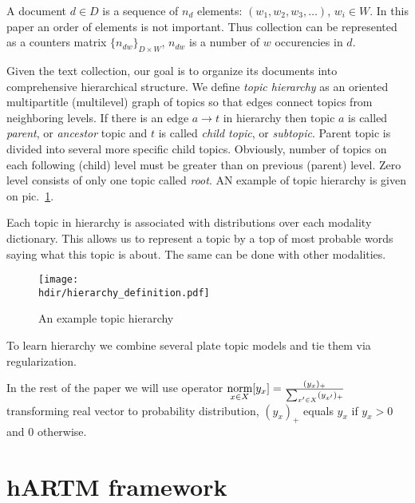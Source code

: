 \documentclass[12pt, twoside]{article}
\newcommand{\hdir}{.}
\begin{document}
A document $d \in D$ is a sequence of $n_d$ elements: $(w_1, w_2, w_3, \dots)$, $w_i \in W$. In this paper an order of elements is not important. Thus collection can be represented as a counters matrix $\{n_{dw}\}_{D \times W}$, $n_{dw}$ is a number of $w$ occurencies in $d$.

Given the text collection, our goal is to organize its documents into comprehensive hierarchical structure. We define \emph{topic hierarchy} as an oriented multipartitle (multilevel) graph of topics so that edges connect topics from neighboring levels. If there is an edge $a \rightarrow t$ in hierarchy then topic $a$ is called \emph{parent}, or \emph{ancestor} topic and $t$ is called \emph{child topic}, or \emph{subtopic}. Parent topic is divided into several more specific child topics. 
Obviously, number of topics on each following (child) level must be greater than on previous (parent) level. Zero level consists of only one topic called \emph{root}. AN example of topic hierarchy is given on pic.~\ref{fg:hierarchy}.

Each topic in hierarchy is associated with distributions over each modality dictionary. This allows us to represent a topic by a top of most probable words saying what this topic is about. The same can be done with other modalities.
\begin{figure}[!th]
	\begin{center}
		\texttt{[image: \\hdir/hierarchy\_definition.pdf]}
	\end{center}
	\caption{An example topic hierarchy}
	\label{fg:hierarchy}
\end{figure}

To learn hierarchy we combine several plate topic models and tie them via regularization.

In the rest of the paper we will use operator 
$\mathop{\text{norm}}\limits_{x \in X} [y_x] = \frac{( y_x )_+}
{\sum_{x' \in X}( y_{x'})_+}$ transforming real vector to probability distribution, $(y_x)_+$ equals $y_x$ if $y_x > 0$ and $0$ otherwise.



\section{hARTM framework}
\end{document}
